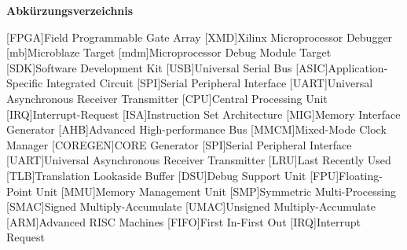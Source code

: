 
{\textbf{Abkürzungsverzeichnis}}

\begin{acronym}[Bash]
 [FPGA]{Field Programmable Gate Array}
 [XMD]{Xilinx Microprocessor Debugger}
 [mb]{Microblaze Target}
 [mdm]{Microprocessor Debug Module Target}
 [SDK]{Software Development Kit}
 [USB]{Universal Serial Bus}
 [ASIC]{Application-Specific Integrated Circuit}
 [SPI]{Serial Peripheral Interface}
 [UART]{Universal Asynchronous Receiver Transmitter}
 [CPU]{Central Processing Unit}
 [IRQ]{Interrupt-Request}
 [ISA]{Instruction Set Architecture}
 [MIG]{Memory Interface Generator}
 [AHB]{Advanced High-performance Bus}
 [MMCM]{Mixed-Mode Clock Manager}
 [COREGEN]{CORE Generator}
 [SPI]{Serial Peripheral Interface}
 [UART]{Universal Asynchronous Receiver Transmitter}
  [LRU]{Last Recently Used}
  [TLB]{Translation Lookaside Buffer}
  [DSU]{Debug Support Unit}
  [FPU]{Floating-Point Unit}
 [MMU]{Memory Management Unit}
  [SMP]{Symmetric Multi-Processing}
 [SMAC]{Signed Multiply-Accumulate}
  [UMAC]{Unsigned Multiply-Accumulate}
 [ARM]{Advanced RISC Machines}
 [FIFO]{First In-First Out}
 [IRQ]{Interrupt Request}

\end{acronym}
